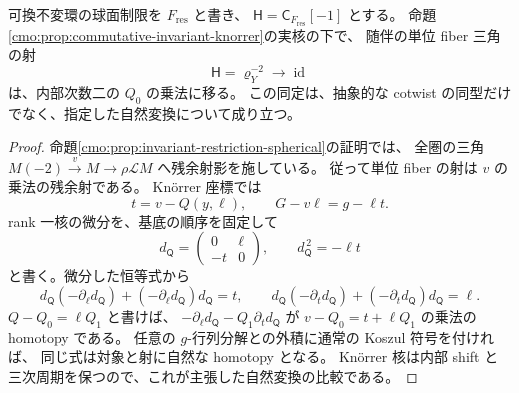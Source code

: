 \begin{lemma}
\label{cmo:lem:cotwist-normal-quadric}
可換不変環の球面制限を $F_{\mathrm{res}}$ と書き、
$\mathsf H=\mathsf C_{F_{\mathrm{res}}}[-1]$ とする。
命題\ref{cmo:prop:commutative-invariant-knorrer}の実核の下で、
随伴の単位 fiber 三角の射
\[
 \mathsf H=\varrho_Y^{-2}\longrightarrow\operatorname{id}
\]
は、内部次数二の $Q_0$ の乗法に移る。
この同定は、抽象的な cotwist の同型だけでなく、指定した自然変換について成り立つ。
\end{lemma}
\begin{proof}
命題\ref{cmo:prop:invariant-restriction-spherical}の証明では、
全圏の三角
$M(-2)\xrightarrow{v}M\to\rho\mathcal L M$
へ残余射影を施している。
従って単位 fiber の射は $v$ の乗法の残余射である。
Kn\"orrer 座標では
\[
 t=v-Q(y,\ell),\qquad G-v\ell=g-\ell t.
\]
rank 一核の微分を、基底の順序を固定して
\[
 d_{\mathsf Q}=\begin{pmatrix}0&\ell\\-t&0\end{pmatrix},
 \qquad d_{\mathsf Q}^{\,2}=-\ell t
\]
と書く。微分した恒等式から
\[
 d_{\mathsf Q}(-\partial_\ell d_{\mathsf Q})
       +(-\partial_\ell d_{\mathsf Q})d_{\mathsf Q}=t,\qquad
 d_{\mathsf Q}(-\partial_t d_{\mathsf Q})
       +(-\partial_t d_{\mathsf Q})d_{\mathsf Q}=\ell.
\]
$Q-Q_0=\ell Q_1$ と書けば、
$-\partial_\ell d_{\mathsf Q}-Q_1\partial_t d_{\mathsf Q}$
が $v-Q_0=t+\ell Q_1$ の乗法の homotopy である。
任意の $g$-行列分解との外積に通常の Koszul 符号を付ければ、
同じ式は対象と射に自然な homotopy となる。
Kn\"orrer 核は内部 shift と三次周期を保つので、これが主張した自然変換の比較である。
\end{proof}

